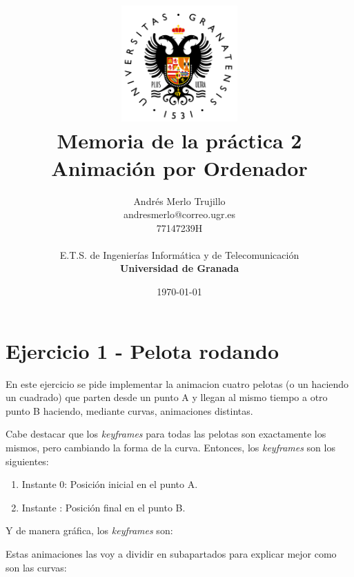\documentclass{article}
\title{
\includegraphics[width=1.75in]{imagenes/UGR-Logo.png} \\
\vspace*{1in}
\textbf{Memoria de la práctica 2} \\
Animación por Ordenador \\
\vspace*{0.5in}}
\author{Andrés Merlo Trujillo \\
andresmerlo@correo.ugr.es \\
77147239H \\ 
\vspace*{0.5in} \\
E.T.S. de Ingenierías Informática y de Telecomunicación \\
\textbf{Universidad de Granada}} \date{\today}
\begin{document}
\begin{titlingpage}
\maketitle
\end{titlingpage}

\tableofcontents

\newpage

\pagestyle{fancy}   %

\section{Ejercicio 1 - Pelota rodando}

En este ejercicio se pide implementar la animacion cuatro pelotas (o un haciendo un cuadrado) que parten desde un punto A y llegan al mismo tiempo a otro punto B haciendo, mediante curvas, animaciones distintas.

\bigskip

Cabe destacar que los \textit{keyframes} para todas las pelotas son exactamente los mismos, pero cambiando la forma de la curva. Entonces, los \textit{keyframes} son los siguientes:

\begin{enumerate}
    \item Instante 0: Posición inicial en el punto A.
    \item Instante : Posición final en el punto B.
\end{enumerate}

Y de manera gráfica, los \textit{keyframes} son:


\bigskip


Estas animaciones las voy a dividir en subapartados para explicar mejor como son las curvas:
\end{document}
